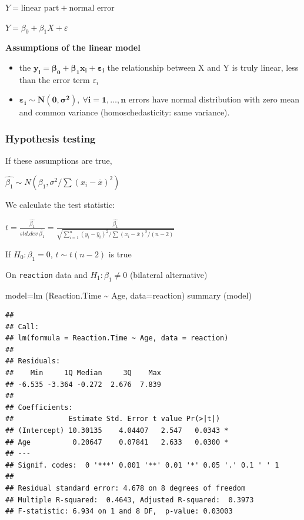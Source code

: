\documentclass[
]{article}
\newenvironment{Shaded}{\begin{snugshade}}{\end{snugshade}}
\newcommand{\AttributeTok}[1]{\textcolor[rgb]{0.77,0.63,0.00}{#1}}
\newcommand{\FunctionTok}[1]{\textcolor[rgb]{0.00,0.00,0.00}{#1}}
\newcommand{\NormalTok}[1]{#1}
\newcommand{\OtherTok}[1]{\textcolor[rgb]{0.56,0.35,0.01}{#1}}
\newcommand{\SpecialCharTok}[1]{\textcolor[rgb]{0.00,0.00,0.00}{#1}}
\providecommand{\tightlist}{%
  \setlength{\itemsep}{0pt}\setlength{\parskip}{0pt}}
\begin{document}
\(Y=\textrm{linear part} + \textrm{normal error}\)

\(Y=\beta_0 + \beta_1 X + \varepsilon\)

\textbf{Assumptions of the linear model }

\begin{itemize}
\tightlist
\item
  the \(\boldsymbol{y_i=\beta_0 + \beta_1 x_i + \varepsilon_i}\) the
  relationship between X and Y is truly linear, less than the error term
  \(\varepsilon_i\)
\item
  \(\boldsymbol{\varepsilon_i \sim N (0, \sigma ^ 2), \ \forall i=1, \ldots, n}\)
  errors have normal distribution with zero mean and common variance
  (homoschedasticity: same variance).
\end{itemize}

\hypertarget{hypothesis-testing}{%
\subsubsection{Hypothesis testing}\label{hypothesis-testing}}

If these assumptions are true,

\(\hat{\beta_1} \sim N (\beta_1, \sigma ^ 2 / \sum (x_i- \bar{x}) ^ 2)\)

We calculate the test statistic:

\(t=\frac{\hat{\beta_1}}{std.dev\ \hat{\beta_1}}=\frac{\hat{\beta_1}}{\sqrt{\sum_{i=1} ^ n (y_i- \hat{y}_i) ^ 2 / \sum (x_i- \bar{x}) ^ 2 / (n-2)}}\)

If \(H_0: \beta_1=0\), \(t \sim t (n-2)\) is true

On \texttt{reaction} data and \(H_1: \beta_1 \neq 0\) (bilateral
alternative)

\begin{Shaded}
\begin{Highlighting}[]
\NormalTok{model}\OtherTok{=}\FunctionTok{lm}\NormalTok{ (Reaction.Time }\SpecialCharTok{\textasciitilde{}}\NormalTok{ Age, }\AttributeTok{data=}\NormalTok{reaction)}
\FunctionTok{summary}\NormalTok{ (model)}
\end{Highlighting}
\end{Shaded}

\begin{verbatim}
## 
## Call:
## lm(formula = Reaction.Time ~ Age, data = reaction)
## 
## Residuals:
##    Min     1Q Median     3Q    Max 
## -6.535 -3.364 -0.272  2.676  7.839 
## 
## Coefficients:
##             Estimate Std. Error t value Pr(>|t|)  
## (Intercept) 10.30135    4.04407   2.547   0.0343 *
## Age          0.20647    0.07841   2.633   0.0300 *
## ---
## Signif. codes:  0 '***' 0.001 '**' 0.01 '*' 0.05 '.' 0.1 ' ' 1
## 
## Residual standard error: 4.678 on 8 degrees of freedom
## Multiple R-squared:  0.4643, Adjusted R-squared:  0.3973 
## F-statistic: 6.934 on 1 and 8 DF,  p-value: 0.03003
\end{verbatim}
\end{document}
